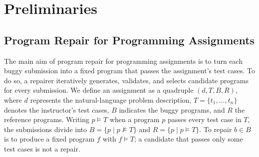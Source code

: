 \documentclass[acmsmall,screen,review,anonymous,nonacm]{acmart}
\begin{document}
\section{Preliminaries}
\label{sec:prelim}

\subsection{Program Repair for Programming Assignments}
\label{sec:prelim-apr}

The main aim of program repair for programming assignments is to turn each buggy submission into a fixed program that passes the assignment's test cases. To do so, a repairer iteratively generates, validates, and selects candidate programs for every submission. We define an assignment as a quadruple $(d, T, B, R)$, where $d$ represents the natural-language problem description, $T = \{t_1, \dots, t_n\}$ denotes the instructor's test cases, $B$ indicates the buggy programs, and $R$ the reference programs. Writing $p \models T$ when a program $p$ passes every test case in $T$, the submissions divide into $B = \{p \mid p \not\models T\}$ and $R = \{p \mid p \models T\}$. To repair $b \in B$ is to produce a fixed program $f$ with $f \models T$; a candidate that passes only some test cases is not a repair.
\end{document}
